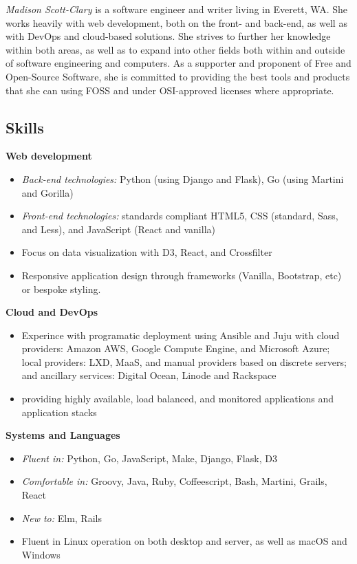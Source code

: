 \documentclass[letterpaper]{memoir}
\begin{document}


\noindent\textit{\large Madison Scott-Clary} is a software engineer and writer living in Everett, WA. She works heavily with web development, both on the front- and back-end, as well as with DevOps and cloud-based solutions. She strives to further her knowledge within both areas, as well as to expand into other fields both within and outside of software engineering and computers. As a supporter and proponent of Free and Open-Source Software, she is committed to providing the best tools and products that she can using FOSS and under OSI-approved licenses where appropriate.

\subsection{Skills}

\textbf{Web development}

\begin{itemize}
    \item \textit{Back-end technologies:} Python (using Django and Flask), Go (using Martini and Gorilla)
    \item \textit{Front-end technologies:} standards compliant HTML5, CSS (standard, Sass, and Less), and JavaScript (React and vanilla)
    \item Focus on data visualization with D3, React, and Crossfilter
    \item Responsive application design through frameworks (Vanilla, Bootstrap, etc) or bespoke styling.
\end{itemize}

\hspace{-1.5em}\textbf{Cloud and DevOps}

\begin{itemize}
    \item Experince with programatic deployment using Ansible and Juju with cloud providers: Amazon AWS, Google Compute Engine, and Microsoft Azure; local providers: LXD, MaaS, and manual providers based on discrete servers; and ancillary services: Digital Ocean, Linode and Rackspace
    \item providing highly available, load balanced, and monitored applications and application stacks
\end{itemize}

\hspace{-1.5em}\textbf{Systems and Languages}

\begin{itemize}
    \item \textit{Fluent in:} Python, Go, JavaScript, Make, Django, Flask, D3
    \item \textit{Comfortable in:} Groovy, Java, Ruby, Coffeescript, Bash, Martini, Grails, React
    \item \textit{New to:} Elm, Rails
    \item Fluent in Linux operation on both desktop and server, as well as macOS and Windows
\end{itemize}
\end{document}
